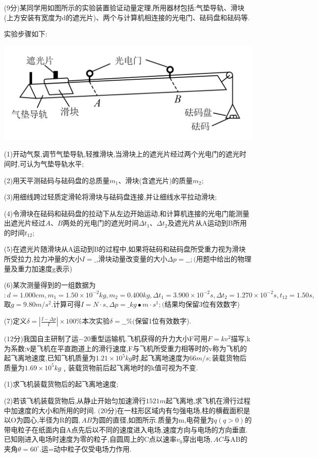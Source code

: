 \newpage
\question[6] (9分)某同学用如图所示的实验装置验证动量定理,所用器材包括:气垫导轨、滑块(上方安装有宽度为d的遮光片)、两个与计算机相连接的光电门、砝码盘和砝码等.

实验步骤如下:
\begin{center}
    \includegraphics[]{img/image12.png}
\end{center}
(1)开动气泵,调节气垫导轨,轻推滑块,当滑块上的遮光片经过两个光电门的遮光时间时,可认为气垫导轨水平;

(2)用天平测砝码与砝码盘的总质量$m_1$、滑块(含遮光片)的质量$m_2$;

(3)用细线跨过轻质定滑轮将滑块与砝码盘连接,并让细线水平拉动滑块;

(4)令滑块在砝码和砝码盘的拉动下从左边开始运动,和计算机连接的光电门能测量出遮光片经过$A、B$两处的光电门的遮光时间$Δt_1$、$Δt_2$及遮光片从A运动到B所用的时间$t_{12}$;

(5)在遮光片随滑块从A运动到B的过程中,如果将砝码和砝码盘所受重力视为滑块所受拉力,拉力冲量的大小$I=\_$,滑块动量改变量的大小$Δp=\_\_;($用题中给出的物理量及重力加速度g表示)

(6)某次测量得到的一组数据为$:d=1.000cm,m_1=1.50×10^{-2}kg,m_2=0.400kg,Δt_1=3.900×10^{-2}s,Δt_2=1.270×10^{-2}s,t_{12}=1.50s,$取$g=9.80m/s^2.$计算可得$I=N·s,Δp=\_kg∙m·s^1;($结果均保留3位有效数字)

(7)定义$\delta=|\frac{I-\Delta p}{I}|\times 100\%$本次实验$δ=\_\_\%($保留1位有效数字).


\question[6] $(12$分)我国自主研制了运$-20$重型运输机.飞机获得的升力大小F可用$F=kv^2$描写,k为系数;ν是飞机在平直跑道上的滑行速度,F与飞机所受重力相等时的v称为飞机的起飞离地速度,已知飞机质量为$1.21×10^5kg$时,起飞离地速度为$66m/s;$装载货物后质量为$1.69×10^5kg﹐$装载货物前后起飞离地时的k值可视为不变.

(1)求飞机装载货物后的起飞离地速度;

(2)若该飞机装载货物后,从静止开始匀加速滑行$1521m$起飞离地,求飞机在滑行过程中加速度的大小和所用的时间.
\newpage
\question[6] $(20$分)在一柱形区域内有匀强电场,柱的横截面积是以O为圆心,半径为R的圆$,AB$为圆的直径,如图所示.质量为m,电荷量为$q(q>0)$的带电粒子在纸面内自A点先后以不同的速度进入电场,速度方向与电场的方向垂直.已知刚进入电场时速度为零的粒子,自圆周上的C点以速率$v_0$穿出电场$,AC$与AB的夹角$θ=60^∘.$运=动中粒子仅受电场力作用.

